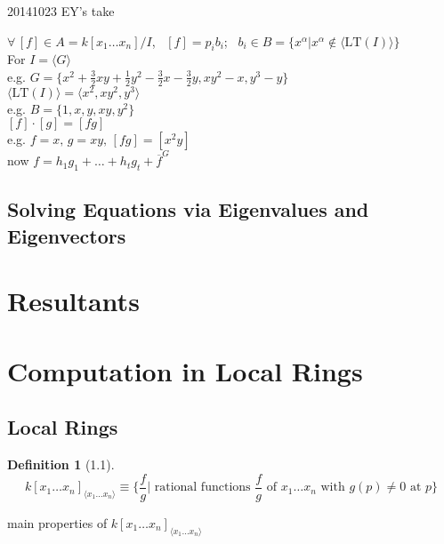 \documentclass[10pt]{amsart}
\newtheorem{definition}{Definition}
\begin{document}
\begin{multicols*}{2}
20141023 EY's take

$\forall \, [f] \in A = k[x_1 \dots x_n]/I$, \, $[f] = p_ib_i$; \, $b_i \in B = \lbrace x^{\alpha} | x^{\alpha} \notin \langle \text{LT}(I) \rangle \rbrace$ \\
For $I = \langle G \rangle$ \\
\phantom{\quad } e.g. $G=\lbrace x^2 + \frac{3}{2} xy + \frac{1}{2} y^2 - \frac{3}{2} x - \frac{3}{2} y, xy^2-x, y^3-y \rbrace$ \\
$\langle \text{LT}(I) \rangle = \langle x^2, xy^2,y^3 \rangle$ \\
e.g. $B=\lbrace 1,x,y,xy,y^2\rbrace$ \\
\phantom{\quad } $[f]\cdot[g] = [fg]$ \\
e.g. $f=x, \, g=xy, \, [fg] = [x^2y]$ \\
now $f=h_1g_1 + \dots +h_tg_t+ \overline{f}^G$

\subsection{}

\subsection{Solving Equations via Eigenvalues and Eigenvectors}


\section{Resultants}

\section{Computation in Local Rings}

\subsection{Local Rings}


\begin{definition}[1.1]
  \[
k[x_1 \dots x_n]_{\langle x_1 \dots x_n \rangle} \equiv \lbrace \frac{f}{g} | \text{ rational functions } \frac{f}{g} \text{ of } x_1 \dots x_n \text{ with } g(p) \neq 0 \text{ at } p \rbrace
\]
\end{definition}

main properties of $k[x_1 \dots x_n]_{\langle x_1 \dots x_n \rangle }$


\end{multicols*}
\end{document}
